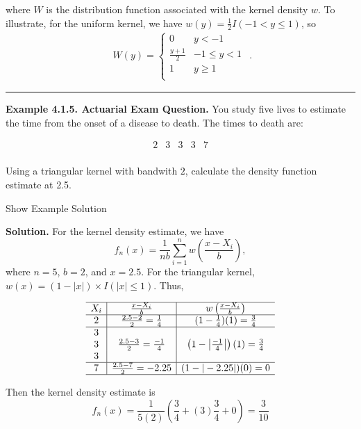 \documentclass[]{book}
\theoremstyle{definition}
\theoremstyle{definition}
\theoremstyle{definition}
\theoremstyle{remark}
\begin{document}
where \(W\) is the distribution function associated with the kernel
density \(w\). To illustrate, for the uniform kernel, we have
\(w(y) = \frac{1}{2}I(-1 < y \le 1)\), so \[
\begin{aligned}
W(y) =
\begin{cases}
0 &            y<-1\\
\frac{y+1}{2}& -1 \le y < 1 \\
1 & y \ge 1 \\
\end{cases}\end{aligned} .
\]

\begin{center}\rule{0.5\linewidth}{\linethickness}\end{center}

\textbf{Example 4.1.5. Actuarial Exam Question.} You study five lives to
estimate the time from the onset of a disease to death. The times to
death are:

\[\begin{array}{ccccc}
2 & 3 & 3 & 3 & 7  \\
\end{array}\]

Using a triangular kernel with bandwith \(2\), calculate the density
function estimate at 2.5.

Show Example Solution

\hypertarget{toggleExampleSelect.1.5}{}
\textbf{Solution.} For the kernel density estimate, we have
\[f_n(x) = \frac{1}{nb} \sum_{i=1}^n w\left(\frac{x-X_i}{b}\right),\]
where \(n=5\), \(b=2\), and \(x=2.5\). For the triangular kernel,
\(w(x) = (1-|x|)\times I(|x| \le 1)\). Thus,

\[\begin{array}{c|c|c}
\hline
X_i & \frac{x-X_i}{b} & w\left(\frac{x-X_i}{b} \right) \\
\hline 
2 & \frac{2.5-2}{2}=\frac{1}{4} &  (1-\frac{1}{4})(1) = \frac{3}{4} \\
\hline
3 & & \\
3 & \frac{2.5-3}{2}=\frac{-1}{4} & \left(1-\left| \frac{-1}{4} \right| \right)(1) = \frac{3}{4} \\
3 & & \\
\hline
7 & \frac{2.5-7}{2}=-2.25 & (1-|-2.25|)(0) = 0\\
\hline
\end{array}\]

Then the kernel density estimate is
\[f_n(x) = \frac{1}{5(2)}\left( \frac{3}{4} + (3) \frac{3}{4} + 0 \right) = \frac{3}{10}\]
\end{document}
